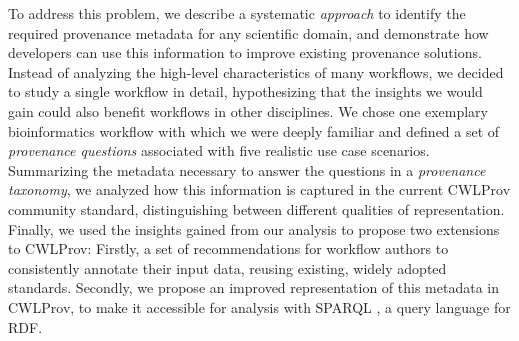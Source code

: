 



To address this problem, we describe a systematic \emph{approach} to identify the required provenance metadata for any scientific domain, and demonstrate how developers can use this information to improve existing provenance solutions. Instead of analyzing the high-level characteristics of many workflows, we decided to study a single workflow in detail, hypothesizing that the insights we would gain could also benefit workflows in other disciplines. 
We chose one exemplary bioinformatics workflow with which we were deeply familiar and defined a set of \emph{provenance questions} associated with five realistic use case scenarios. Summarizing the metadata necessary to answer the questions in a \emph{provenance taxonomy}, we analyzed how this information is captured in the current CWLProv community standard, distinguishing between different qualities of representation. Finally, we used the insights gained from our analysis to propose two extensions to CWLProv: Firstly, a set of recommendations for workflow authors to consistently annotate their input data, reusing existing, widely adopted standards. Secondly, we propose an improved representation of this metadata in CWLProv, to make it accessible for analysis with SPARQL \cite{sparql11-overview}, a query language for RDF.

